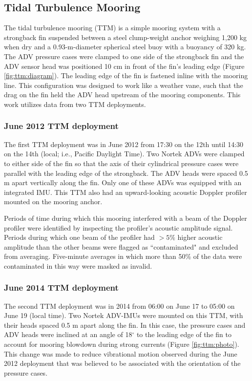 \subsection{Tidal Turbulence Mooring}

The tidal turbulence mooring (TTM) is a simple mooring system with a strongback fin suspended between a steel clump-weight anchor weighing 1,200 kg when dry and a 0.93-m-diameter spherical steel buoy with a buoyancy of 320 kg. The ADV pressure cases were clamped to one side of the strongback fin and the ADV sensor head was positioned 10 cm in front of the fin's leading edge (Figure \ref{fig:ttm:diagram}). The leading edge of the fin is fastened inline with the mooring line. This configuration was designed to work like a weather vane, such that the drag on the fin held the ADV head upstream of the mooring components.  This work utilizes data from two TTM deployments. 

\subsubsection{June 2012 TTM deployment}

The first TTM deployment was in June 2012 from 17:30 on the 12th until 14:30 on the 14th (local; i.e., Pacific Daylight Time). Two Nortek ADVs were clamped to either side of the fin so that the axis of their cylindrical pressure cases were parallel with the leading edge of the strongback. The ADV heads were spaced 0.5 m apart vertically along the fin. Only one of these ADVs was equipped with an integrated IMU. This TTM also had an upward-looking acoustic Doppler profiler mounted on the mooring anchor.

Periods of time during which this mooring interfered with a beam of the Doppler profiler were identified by inspecting the profiler's acoustic amplitude signal. Periods during which one beam of the profiler had $>5\%$ higher acoustic amplitude than the other beams were flagged as ``contaminated" and excluded from averaging.  Five-minute averages in which more than 50\% of the data were contaminated in this way were masked as invalid.

\subsubsection{June 2014 TTM deployment}

The second TTM deployment was in 2014 from 06:00 on June 17 to 05:00 on June 19 (local time).  Two Nortek ADV-IMUs were mounted on this TTM, with their heads spaced 0.5 m apart along the fin. In this case, the pressure cases and ADV heads were inclined at an angle of 18$^\circ$ to the leading edge of the fin to account for mooring blowdown during strong currents (Figure \ref{fig:ttm:photo}). This change was made to reduce vibrational motion observed during the June 2012 deployment that was believed to be associated with the orientation of the pressure cases.

